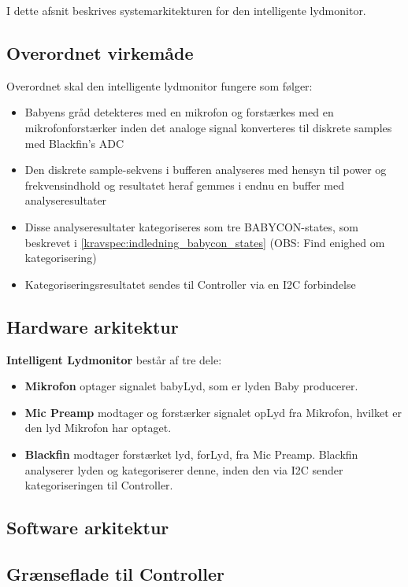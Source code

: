 
I dette afsnit beskrives systemarkitekturen for den intelligente lydmonitor.

\subsection*{Overordnet virkemåde}
Overordnet skal den intelligente lydmonitor fungere som følger:
\begin{itemize}
	\item Babyens gråd detekteres med en mikrofon og forstærkes med en mikrofonforstærker inden det analoge signal konverteres til diskrete samples med Blackfin's ADC
	\item Den diskrete sample-sekvens i bufferen analyseres med hensyn til power og frekvensindhold og resultatet heraf gemmes i endnu en buffer med analyseresultater
	\item Disse analyseresultater kategoriseres som tre BABYCON-states, som beskrevet i \ref{kravspec:indledning_babycon_states} (OBS: Find enighed om kategorisering)
	\item Kategoriseringsresultatet sendes til Controller via en I2C forbindelse
\end{itemize}


\newpage
\subsection*{Hardware arkitektur}

\textbf{Intelligent Lydmonitor} består af tre dele: 
\begin{itemize}
\item \textbf{Mikrofon} optager signalet babyLyd, som er lyden Baby producerer. 
\item \textbf{Mic Preamp} modtager og forstærker signalet opLyd fra Mikrofon, hvilket er den lyd Mikrofon har optaget. 
\item \textbf{Blackfin} modtager forstærket lyd, forLyd, fra Mic Preamp. Blackfin analyserer lyden og kategoriserer denne, inden den via I2C sender kategoriseringen til Controller. 
\end{itemize}

\newpage
\subsection*{Software arkitektur}




\subsection*{Grænseflade til Controller}


